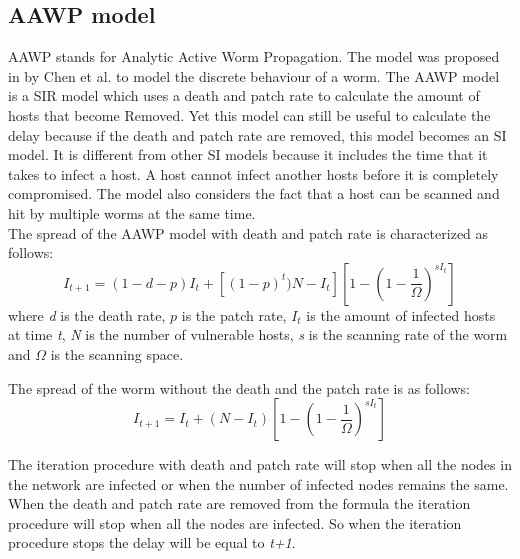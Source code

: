 
\subsection{AAWP model}
AAWP stands for Analytic Active Worm Propagation. The model was proposed in \cite{chen2003modeling} by Chen et al. to model the discrete behaviour of a worm. The AAWP model is a SIR model which uses a death and patch rate to calculate the amount of hosts that become Removed. Yet this model can still be useful to calculate the delay because if the death and patch rate are removed, this model becomes an SI model. It is different from other SI models because it includes the time that it takes to infect a host. A host cannot infect another hosts before it is completely compromised. The model also considers the fact that a host can be scanned and hit by multiple worms at the same time. \\%

The spread of the AAWP model with death and patch rate is characterized as follows:
\begin{equation}
I_{t+1}=(1-d-p)I_{t}+[(1-p)^{t})N-I_{t}][1-(1-\dfrac{1}{\Omega})^{sI_{t}}]
\end{equation}
where \textit{d} is the death rate, $p$ is the patch rate, $I_{t}$ is the amount of infected hosts at time \textit{t}, \textit{N} is the number of vulnerable hosts, \textit{s} is
the scanning rate of the worm and $\Omega$ is the scanning
space. 

The spread of the worm without the death and the patch rate is as follows:
\begin{equation}
I_{t+1}=I_{t}+(N-I_{t})[1-(1-\dfrac{1}{\Omega})^{sI_{t}}]
\end{equation}

The iteration procedure with death and patch rate will stop when all the nodes in the network are infected or when the number of infected nodes remains the same. When the death and patch rate are removed from the formula the iteration procedure will stop when all the nodes are infected. So when the iteration procedure stops the delay will be equal to \textit{t+1}. \\


